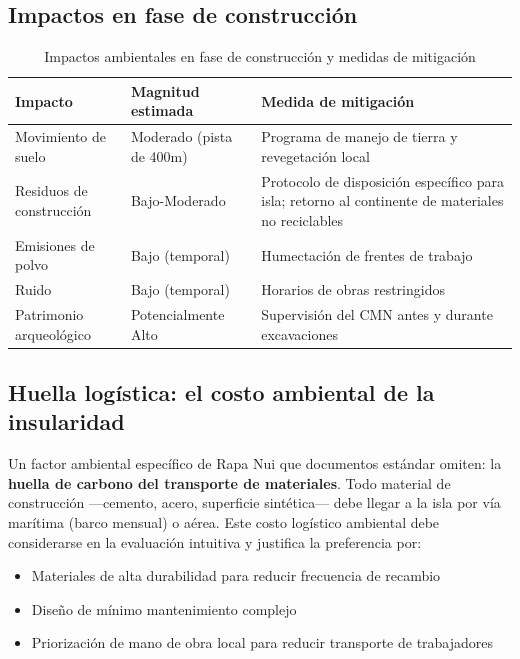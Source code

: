 \documentclass[12pt, a4paper]{article}
\begin{document}
\subsection{Impactos en fase de construcción}

\begin{table}[h!]
\centering
\begin{tabularx}{\linewidth}{lXX}
\toprule
\textbf{Impacto} & \textbf{Magnitud estimada} & \textbf{Medida de mitigación} \\
\midrule
Movimiento de suelo & Moderado (pista de 400m) & Programa de manejo de tierra y revegetación local \\
Residuos de construcción & Bajo-Moderado & Protocolo de disposición específico para isla; retorno al continente de materiales no reciclables \\
Emisiones de polvo & Bajo (temporal) & Humectación de frentes de trabajo \\
Ruido & Bajo (temporal) & Horarios de obras restringidos \\
Patrimonio arqueológico & Potencialmente Alto & Supervisión del CMN antes y durante excavaciones \\
\bottomrule
\end{tabularx}
\caption{Impactos ambientales en fase de construcción y medidas de mitigación}
\end{table}

\subsection{Huella logística: el costo ambiental de la insularidad}

Un factor ambiental específico de Rapa Nui que documentos estándar omiten: la
\textbf{huella de carbono del transporte de materiales}. Todo material de construcción
---cemento, acero, superficie sintética--- debe llegar a la isla por vía marítima
(barco mensual) o aérea. Este costo logístico ambiental debe considerarse en la
evaluación intuitiva y justifica la preferencia por:

\begin{itemize}[leftmargin=*, itemsep=3pt]
  \item Materiales de alta durabilidad para reducir frecuencia de recambio
  \item Diseño de mínimo mantenimiento complejo
  \item Priorización de mano de obra local para reducir transporte de trabajadores
\end{itemize}
\end{document}
